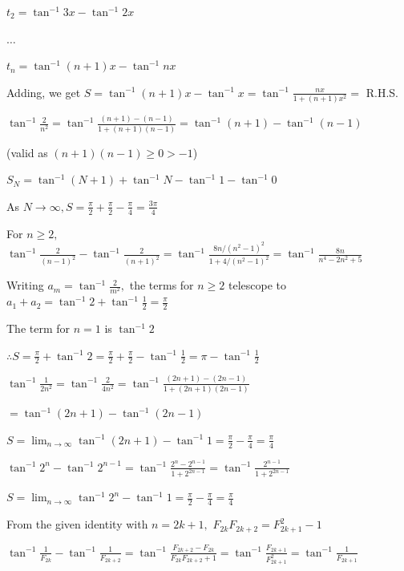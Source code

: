   $t_2 = \tan^{-1}3x - \tan^{-1}2x$

  $\ldots$

  $t_n = \tan^{-1}(n + 1)x - \tan^{-1}nx$

  Adding, we get $S = \tan^{-1}(n + 1)x - \tan^{-1}x = \tan^{-1}\frac{nx}{1 + (n + 1)x^2} =$ R.H.S.
\stopitemize

\subject{Challenging Problems}
\startitemize[n, 1*broad]
\item $\tan^{-1}\frac{2}{n^2} = \tan^{-1}\frac{(n + 1) - (n - 1)}{1 + (n + 1)(n - 1)} = \tan^{-1}(n + 1) - \tan^{-1}(n - 1)$

  (valid as $(n + 1)(n - 1)\geq 0 > -1$)

  $S_N = \tan^{-1}(N + 1) + \tan^{-1}N - \tan^{-1}1 - \tan^{-1}0$

  As $N\to\infty, S = \frac{\pi}{2} + \frac{\pi}{2} - \frac{\pi}{4} = \frac{3\pi}{4}$

\item For $n\geq 2,$ $\tan^{-1}\frac{2}{(n - 1)^2} - \tan^{-1}\frac{2}{(n + 1)^2} = \tan^{-1}\frac{8n/(n^2 - 1)^2}{1 + 4/(n^2 -
  1)^2} = \tan^{-1}\frac{8n}{n^4 - 2n^2 + 5}$

  Writing $a_m = \tan^{-1}\frac{2}{m^2},$ the terms for $n\geq 2$ telescope to $a_1 + a_2 = \tan^{-1}2 + \tan^{-1}\frac{1}{2} =
  \frac{\pi}{2}$

  The term for $n = 1$ is $\tan^{-1}2$

  $\therefore S = \frac{\pi}{2} + \tan^{-1}2 = \frac{\pi}{2} + \frac{\pi}{2} - \tan^{-1}\frac{1}{2} = \pi - \tan^{-1}\frac{1}{2}$

\item $\tan^{-1}\frac{1}{2n^2} = \tan^{-1}\frac{2}{4n^2} = \tan^{-1}\frac{(2n + 1) - (2n - 1)}{1 + (2n + 1)(2n - 1)}$

  $= \tan^{-1}(2n + 1) - \tan^{-1}(2n - 1)$

  $S = \lim_{n\to\infty}\tan^{-1}(2n + 1) - \tan^{-1}1 = \frac{\pi}{2} - \frac{\pi}{4} = \frac{\pi}{4}$

\item $\tan^{-1}2^n - \tan^{-1}2^{n - 1} = \tan^{-1}\frac{2^n - 2^{n - 1}}{1 + 2^{2n - 1}} = \tan^{-1}\frac{2^{n - 1}}{1 + 2^{2n - 1}}$

  $S = \lim_{n\to\infty}\tan^{-1}2^n - \tan^{-1}1 = \frac{\pi}{2} - \frac{\pi}{4} = \frac{\pi}{4}$

\item From the given identity with $n = 2k + 1,$ $F_{2k}F_{2k + 2} = F_{2k + 1}^2 - 1$

  $\tan^{-1}\frac{1}{F_{2k}} - \tan^{-1}\frac{1}{F_{2k + 2}} = \tan^{-1}\frac{F_{2k + 2} - F_{2k}}{F_{2k}F_{2k + 2} + 1} =
  \tan^{-1}\frac{F_{2k + 1}}{F_{2k + 1}^2} = \tan^{-1}\frac{1}{F_{2k + 1}}$

